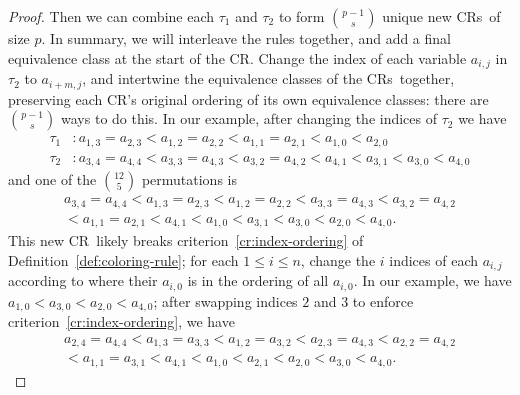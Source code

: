 \documentclass[10pt,a4paper]{article}
\newcommand{\crulenospace}{CR}
\newcommand{\crule}{\crulenospace~}
\newcommand{\crules}{\crulenospace s~}
\newcommand{\numpoints}{n}
\newcommand{\inumpoints}{i}
\newcommand{\idegr}{j}
\newcommand{\commonconst}{a}
\theoremstyle{plain}
\theoremstyle{definition}
\begin{document}
\begin{proof}
Then we can combine each $\tau_1$ and $\tau_2$ to form $\binom{p-1}{s}$ unique new \crules of size $p$.
In summary, we will interleave the rules together, and add a final equivalence class at the start of
the \crulenospace.
Change the index of each variable $\commonconst_{\inumpoints,\idegr}$ in $\tau_2$ to $\commonconst_{\inumpoints+m,\idegr}$, and intertwine the equivalence classes of the \crules together, preserving each \crulenospace's original ordering of its own equivalence classes: there are $\binom{p-1}{s}$ ways to do this. In our example, after changing the indices of $\tau_2$ we have \begin{align*}
\tau_1 & \colon \commonconst_{1,3} = \commonconst_{2,3} < \commonconst_{1,2} = \commonconst_{2,2} < \commonconst_{1,1} = \commonconst_{2,1} < \commonconst_{1,0} < \commonconst_{2,0}\\
\tau_2 & \colon \commonconst_{3,4} = \commonconst_{4,4} < \commonconst_{3,3} = \commonconst_{4,3} < \commonconst_{3,2} = \commonconst_{4,2} < \commonconst_{4,1} < \commonconst_{3,1} < \commonconst_{3,0} < \commonconst_{4,0}
\end{align*} and one of the $\binom{12}{5}$ permutations is \begin{align*}
\commonconst_{3,4} = \commonconst_{4,4} < \commonconst_{1,3} = \commonconst_{2,3} < \commonconst_{1,2} = \commonconst_{2,2} < \commonconst_{3,3} = \commonconst_{4,3} < \commonconst_{3,2} = \commonconst_{4,2} \\ < \commonconst_{1,1} = \commonconst_{2,1} < \commonconst_{4,1} < \commonconst_{1,0} < \commonconst_{3,1} < \commonconst_{3,0} < \commonconst_{2,0} < \commonconst_{4,0}.
\end{align*}This new \crule likely breaks criterion~\ref{cr:index-ordering} of Definition~\ref{def:coloring-rule}; for each $1 \leq \inumpoints \leq \numpoints$, change the $i$ indices of each $\commonconst_{\inumpoints,\idegr}$ according to where their $\commonconst_{\inumpoints,0}$ is in the ordering of all $\commonconst_{i,0}$. In our example, we have $\commonconst_{1,0} < \commonconst_{3,0} < \commonconst_{2,0} < \commonconst_{4,0}$; after swapping indices $2$ and $3$ to enforce criterion~\ref{cr:index-ordering}, we have \begin{align*}
\commonconst_{2,4} = \commonconst_{4,4} < \commonconst_{1,3} = \commonconst_{3,3} < \commonconst_{1,2} = \commonconst_{3,2} < \commonconst_{2,3} = \commonconst_{4,3} < \commonconst_{2,2} = \commonconst_{4,2} \\ < \commonconst_{1,1} = \commonconst_{3,1} < \commonconst_{4,1} < \commonconst_{1,0} < \commonconst_{2,1} < \commonconst_{2,0} < \commonconst_{3,0} < \commonconst_{4,0}.
\end{align*}


\end{proof}
\end{document}
